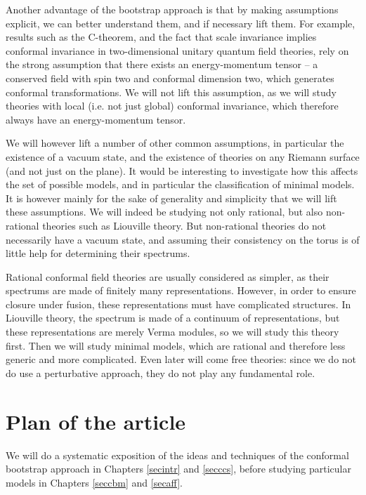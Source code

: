 \documentclass[12pt,a4paper,notitlepage]{report}
\numberwithin{equation}{section}
\theoremstyle{break}
\begin{document}
Another advantage of the bootstrap approach is that by making assumptions explicit, we can better understand them, and if necessary lift them. For example, results such as the C-theorem, and the fact that scale invariance implies conformal invariance in two-dimensional unitary quantum field theories, rely on the strong assumption that there exists an energy-momentum tensor -- a conserved field with spin two and conformal dimension two, which generates conformal transformations. We will not lift this assumption, as we will study theories with local (i.e. not just global) conformal invariance, which therefore always have an energy-momentum tensor.

We will however lift a number of other common assumptions, in particular the existence of a vacuum state, and the existence of theories on any Riemann surface (and not just on the plane). It would be interesting to investigate how this affects the set of possible models, and in particular the classification of minimal models. It is however mainly for the sake of generality and simplicity that
we will lift these assumptions. We will indeed be studying not only rational, but also non-rational theories such as Liouville theory. But non-rational theories do not necessarily have a vacuum state, and assuming their consistency on the torus is of little help for determining their spectrums. 

Rational conformal field theories are usually considered as simpler, as their spectrums are made of finitely many representations. However, in order to ensure closure under fusion, these representations must have complicated structures. In Liouville theory, the spectrum is made of a continuum of representations, but these representations are merely Verma modules, so we will study this theory first. Then we will study minimal models, which are rational and therefore less generic and more complicated. Even later will come free theories: since we do not do use a perturbative approach, they do not play any fundamental role. 


\section{Plan of the article \label{secplan}}

We will do a systematic exposition of the ideas and techniques of the conformal bootstrap approach in Chapters \ref{secintr} and \ref{secccs}, before studying particular models in Chapters \ref{seccbm} and \ref{secaff}.
\end{document}
